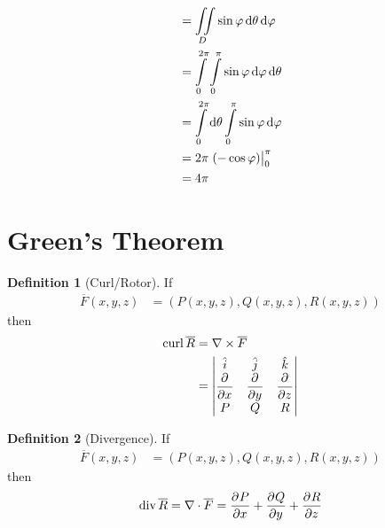 \documentclass[fleqn, a4paper, 8pt, twoside]{amsart}
\theoremstyle{definition}
\theoremstyle{bluedefinition}
\newtheorem{definition}{Definition}
\theoremstyle{redtheorem}
\newcommand{\curl}{\mathrm{curl\,}}
\newcommand{\divergence}{\mathrm{div\,}}
\begin{document}
\begin{multicols}{2}
\begin{spacing}{0.7}
\begin{solution}
\begin{align*}
                                                                   & = \iint\limits_{D} \sin \varphi \dif \theta \dif \varphi                                                                                               \\
                                                                   & = \int\limits_{0}^{2 \pi} \int\limits_{0}^{\pi} \sin \varphi \dif \varphi \dif \theta                                                                  \\
                                                                   & = \int\limits_{0}^{2 \pi} \dif \theta \int\limits_{0}^{\pi} \sin \varphi \dif \varphi                                                                  \\
                                                                   & = 2 \pi \left. \left( -\cos \varphi \right) \right|_{0}^{\pi}                                                                                          \\
                                                                   & = 4 \pi
	\end{align*}
\end{solution}

\section{Green's Theorem}

\begin{definition}[Curl/Rotor]
	If
	\begin{align*}
		\overline{F}(x,y,z) & = \left( P(x,y,z) , Q(x,y,z) , R(x,y,z) \right)
	\end{align*}
	then
	\begin{align*}
		\curl \overline{R} &= \nabla \times \overline{F}\\
		                &=
			\begin{vmatrix}
				\hat{i}   & \hat{j}   & \hat{k}   \\
				\dpd{}{x} & \dpd{}{y} & \dpd{}{z} \\
				P         & Q         & R
			\end{vmatrix}
	\end{align*}
\end{definition}

\begin{definition}[Divergence]
	If
	\begin{align*}
		\overline{F}(x,y,z) & = \left( P(x,y,z) , Q(x,y,z) , R(x,y,z) \right)
	\end{align*}
	then
	\begin{equation*}
		\divergence \overline{R} = \nabla \cdot \overline{F} = \dpd{P}{x} + \dpd{Q}{y} + \dpd{R}{z}
	\end{equation*}
\end{definition}


\end{spacing}
\end{multicols}
\end{document}
